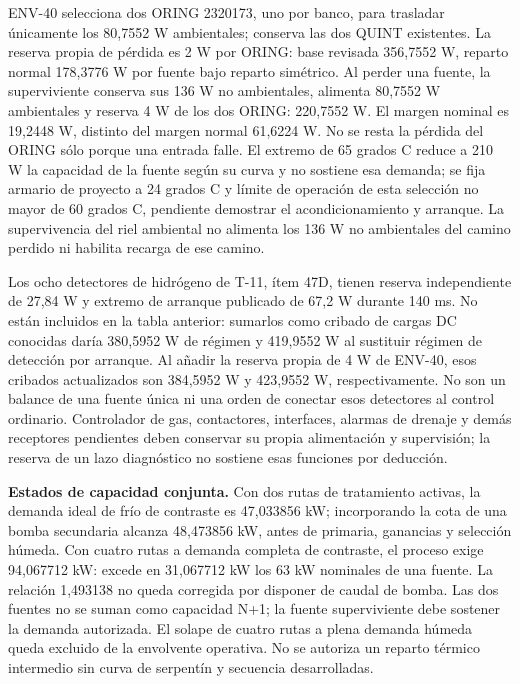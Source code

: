 ENV-40 selecciona dos ORING 2320173, uno por banco, para trasladar únicamente los 80,7552 W ambientales; conserva las dos QUINT existentes. La reserva propia de pérdida es 2 W por ORING: base revisada 356,7552 W, reparto normal 178,3776 W por fuente bajo reparto simétrico. Al perder una fuente, la superviviente conserva sus 136 W no ambientales, alimenta 80,7552 W ambientales y reserva 4 W de los dos ORING: 220,7552 W. El margen nominal es 19,2448 W, distinto del margen normal 61,6224 W. No se resta la pérdida del ORING sólo porque una entrada falle. El extremo de 65 grados C reduce a 210 W la capacidad de la fuente según su curva y no sostiene esa demanda; se fija armario de proyecto a 24 grados C y límite de operación de esta selección no mayor de 60 grados C, pendiente demostrar el acondicionamiento y arranque. La supervivencia del riel ambiental no alimenta los 136 W no ambientales del camino perdido ni habilita recarga de ese camino.


Los ocho detectores de hidrógeno de T-11, ítem 47D, tienen reserva independiente de 27,84 W y extremo de arranque publicado de 67,2 W durante 140 ms. No están incluidos en la tabla anterior: sumarlos como cribado de cargas DC conocidas daría 380,5952 W de régimen y 419,9552 W al sustituir régimen de detección por arranque. Al añadir la reserva propia de 4 W de ENV-40, esos cribados actualizados son 384,5952 W y 423,9552 W, respectivamente. No son un balance de una fuente única ni una orden de conectar esos detectores al control ordinario. Controlador de gas, contactores, interfaces, alarmas de drenaje y demás receptores pendientes deben conservar su propia alimentación y supervisión; la reserva de un lazo diagnóstico no sostiene esas funciones por deducción.

\textbf{Estados de capacidad conjunta.} Con dos rutas de tratamiento activas, la demanda ideal de frío de contraste es 47,033856 kW; incorporando la cota de una bomba secundaria alcanza 48,473856 kW, antes de primaria, ganancias y selección húmeda. Con cuatro rutas a demanda completa de contraste, el proceso exige 94,067712 kW: excede en 31,067712 kW los 63 kW nominales de una fuente. La relación 1,493138 no queda corregida por disponer de caudal de bomba. Las dos fuentes no se suman como capacidad N+1; la fuente superviviente debe sostener la demanda autorizada. El solape de cuatro rutas a plena demanda húmeda queda excluido de la envolvente operativa. No se autoriza un reparto térmico intermedio sin curva de serpentín y secuencia desarrolladas.

